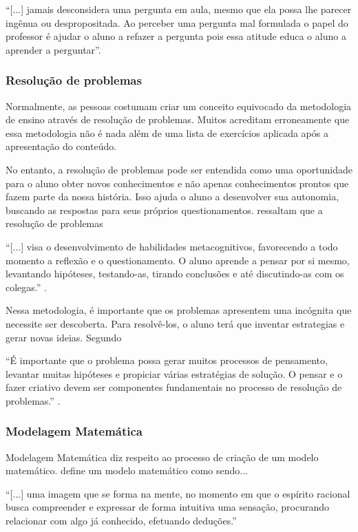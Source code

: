 \begin{citacao}
``[...] jamais desconsidera uma pergunta em aula, mesmo que ela possa lhe parecer ingênua ou despropositada. Ao perceber uma pergunta mal formulada o papel do professor é ajudar o aluno a refazer a pergunta pois essa atitude educa o aluno a aprender a perguntar''.
\end{citacao}

\subsubsection{Resolução de problemas}

Normalmente, as pessoas costumam criar um conceito equivocado da metodologia de ensino através de resolução de problemas. Muitos acreditam erroneamente que essa metodologia não é nada além de uma lista de exercícios aplicada após a apresentação do conteúdo.

No entanto, a resolução de problemas pode ser entendida como uma oportunidade para o aluno obter novos conhecimentos e não apenas conhecimentos prontos que fazem parte da nossa história. Isso ajuda o aluno a desenvolver sua autonomia, buscando as respostas para seus próprios questionamentos.  ressaltam  que a resolução de problemas 

\begin{citacao}
``[...] visa o desenvolvimento de habilidades metacognitivos, favorecendo a todo momento a reflexão e o questionamento. O aluno aprende a pensar por si mesmo, levantando hipóteses, testando-as, tirando conclusões e até discutindo-as com os colegas.'' \cite{fossa1998tendencias}. 
\end{citacao}

Nessa metodologia, é importante que os problemas apresentem uma incógnita que necessite ser descoberta. Para resolvê-los, o aluno terá que inventar estrategias e gerar novas ideias. Segundo 

\begin{citacao}
``É importante que o problema possa gerar muitos processos de pensamento, levantar muitas hipóteses e propiciar várias estratégias de solução. O pensar e o fazer criativo devem ser componentes fundamentais no processo de resolução de problemas.'' \cite{dante1991didatica}.
\end{citacao}

\subsubsection{Modelagem Matemática}
Modelagem Matemática diz respeito ao processo de criação de um modelo matemático.  define um modelo matemático como sendo...
\begin{citacao}
``[...] uma imagem que se forma na mente, no momento em que o espírito racional busca compreender e expressar de forma intuitiva uma sensação, procurando relacionar com algo já conhecido, efetuando deduções.''
\end{citacao}

